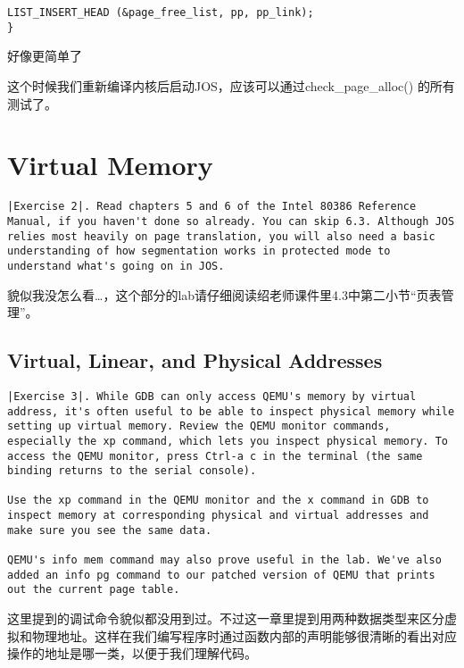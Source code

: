 \documentclass{article}
\newcommand{\funcname}[1]{{\ttfamily \small #1}}
\begin{document}
\begin{CJK*}{UTF8}{gkai}
\begin{lstlisting}[style=ccode, title={\scriptsize \ttfamily \bfseries kern/pmap.c: page\_free ()}]
    LIST_INSERT_HEAD (&page_free_list, pp, pp_link);
}\end{lstlisting}

好像更简单了

这个时候我们重新编译内核后启动JOS，应该可以通过\funcname{check\_page\_alloc() }的所有测试了。

\section{Virtual Memory}


\begin{lstlisting}[style=exercise]
|Exercise 2|. Read chapters 5 and 6 of the Intel 80386 Reference Manual, if you haven't done so already. You can skip 6.3. Although JOS relies most heavily on page translation, you will also need a basic understanding of how segmentation works in protected mode to understand what's going on in JOS.
\end{lstlisting}

貌似我没怎么看\ldots，这个部分的lab请仔细阅读绍老师课件里4.3中第二小节``页表管理''。

\subsection{Virtual, Linear, and Physical Addresses}

\begin{lstlisting}[style=exercise]
|Exercise 3|. While GDB can only access QEMU's memory by virtual address, it's often useful to be able to inspect physical memory while setting up virtual memory. Review the QEMU monitor commands, especially the xp command, which lets you inspect physical memory. To access the QEMU monitor, press Ctrl-a c in the terminal (the same binding returns to the serial console).

Use the xp command in the QEMU monitor and the x command in GDB to inspect memory at corresponding physical and virtual addresses and make sure you see the same data.

QEMU's info mem command may also prove useful in the lab. We've also added an info pg command to our patched version of QEMU that prints out the current page table.
\end{lstlisting}

这里提到的调试命令貌似都没用到过。不过这一章里提到用两种数据类型来区分虚拟和物理地址。这样在我们编写程序时通过函数内部的声明能够很清晰的看出对应操作的地址是哪一类，以便于我们理解代码。


\end{CJK*}
\end{document}
